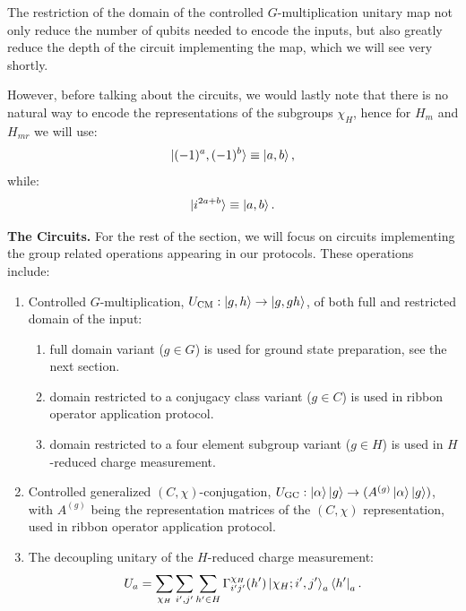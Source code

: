 \documentclass[two column]{article}
\newcommand{\caro}[1]{\textcolor{red}{[#1]}}
\begin{document}
The restriction of the domain of the controlled $G$-multiplication unitary map not only reduce the number of qubits needed to encode the inputs, but also greatly reduce the depth of the circuit implementing the map, which we will see very shortly.

However, before talking about the circuits, we would lastly note that there is no natural way to encode the representations of the subgroups $\chi_H$, hence for $H_m$ and $H_{mr}$ we will use:
\begin{equation}
    \ket{(-1)^a,(-1)^b} \equiv \ket{a,b},
\end{equation}
while:
\begin{equation}
    \ket{i^{2a+b}} \equiv \ket{a, b}.
\end{equation}


\textbf{The Circuits.} For the rest of the section, we will focus on circuits implementing the group related operations appearing in our protocols. These operations include:\begin{enumerate}
    \item Controlled $G$-multiplication, $U_{\text{CM}}: \ket{g, h} \rightarrow \ket{g, gh}$, of both full and restricted domain of the input:\begin{enumerate}
        \item full domain variant ($g \in G$) is used for ground state preparation, see the next section.
        \item domain restricted to a conjugacy class variant ($g \in C$) is used in ribbon operator application protocol.
        \item domain restricted to a four element subgroup variant ($g \in H$) is used in $H$-reduced charge measurement. 
    \end{enumerate}
    \item Controlled generalized $(C, \chi)$-conjugation, $U_{\text{GC}}: \ket{\alpha}\ket{g} \rightarrow (A^{(g)}\ket{\alpha}\ket{g})$, with $A^{(g)}$ being the representation matrices of the $(C, \chi)$ representation, used in ribbon operator application protocol.
    \item The decoupling unitary of the $H$-reduced charge measurement: $$ U_a = \sum_{\chi_H}\sum_{i', j'}\sum_{h'\in H}  \Gamma^{\chi_H}_{i'j'}(h')  \ket{\chi_H; i', j'}_a\bra{h'}_a. $$
\end{enumerate} 
\end{document}
